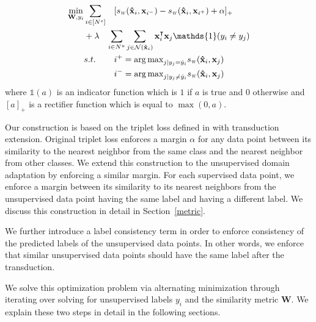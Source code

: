 \begin{equation}
\begin{aligned}
\min_{\mathbf{W}, y_i} &\sum_{i \in [N^s]} &&[\sw(\xsi,\mathbf{x}_{i^-}) - \sw(\xsi,\mathbf{x}_{i^+}) + \alpha]_{+}  \\
&+\lambda &&\hspace{-3mm}\sum_{i \in N^u} \sum_{j \in \mathcal{N}(\xsi)}  \xui^\intercal \xuj \mathds{1}(y_i \neq y_j)\\
&s.t. \quad &&i^{+} = {\arg\max}_{j | y_j = \hat{y}_i} \sw(\mathbf{\hat{x}}_i,\mathbf{x}_{j}) \\
&\quad &&i^{-} = {\arg\max}_{j | y_j \neq \hat{y}_i} \sw(\mathbf{\hat{x}}_i,\mathbf{x}_{j}) 
\end{aligned}
\label{loss}
\end{equation}
where $\mathds{1}(a)$ is an indicator function which is $1$ if $a$ is true and $0$ otherwise and $[a]_+$ is a rectifier function which is equal to $\max(0, a)$. 

Our construction is based on the triplet loss defined in \cite{lmnn} with transduction extension. Original triplet loss \cite{lmnn} enforces a margin $\alpha$ for any data point between its similarity to the nearest neighbor from the same class and the nearest neighbor from other classes. We extend this construction to the unsupervised domain adaptation by enforcing a similar margin. For each supervised data point, we enforce a margin between its similarity to its nearest neighbors from the unsupervised data point having the same label and having a different label. We discuss this construction in detail in Section~\ref{metric}.

We further introduce a label consistency term in order to enforce consistency of the predicted labels of the unsupervised data points. In other words, we enforce that similar unsupervised data points should have the same label after the transduction. 



We solve this optimization problem via alternating minimization through iterating over solving for unsupervised labels $y_i$ and the similarity metric $\mathbf{W}$. We explain these two steps in detail in the following sections.

 


